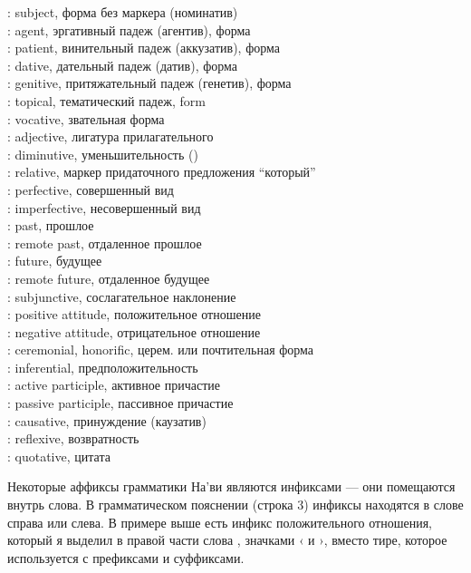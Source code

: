 \begin{multicols}{2}
\noindent{}: subject, форма без маркера (номинатив) \\
: agent, эргативный падеж (агентив), форма  \\
: patient, винительный падеж (аккузатив), форма  \\
: dative, дательный падеж (датив), форма  \\
: genitive, притяжательный падеж (генетив), форма
 \\
: topical, тематический падеж,  form \\
: vocative, звательная форма  \\
: adjective, лигатура прилагательного  \\
: diminutive, уменьшительность () \\
: relative, маркер придаточного предложения ``который''  \\
: perfective, совершенный вид \\
: imperfective, несовершенный вид \\
: past, прошлое \\
: remote past, отдаленное прошлое \\
: future, будущее \\
: remote future, отдаленное будущее \\
: subjunctive, сослагательное наклонение \\
: positive attitude, положительное отношение \\
: negative attitude, отрицательное отношение \\
: ceremonial, honorific, церем. или почтительная форма \\
: inferential, предположительность \\
: active participle, активное причастие \\
: passive participle, пассивное причастие \\
: causative, принуждение (каузатив) \\
: reflexive, возвратность \\
: quotative, цитата 
\end{multicols}

\noindent Некоторые аффиксы грамматики На'ви являются инфиксами
— они помещаются внутрь слова. В грамматическом пояснении
(строка 3) инфиксы находятся в слове справа или слева. В примере
выше есть инфикс положительного отношения, который я выделил в
правой части слова , значками ‹
и ›, вместо тире, которое используется с префиксами и
суффиксами.


